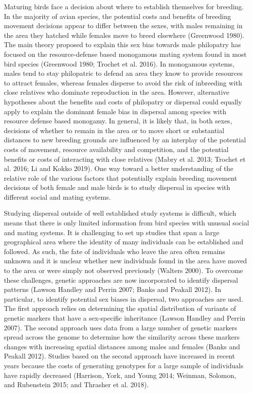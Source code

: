 \documentclass[
]{article}
\begin{document}
Maturing birds face a decision about where to establish themselves for
breeding. In the majority of avian species, the potential costs and
benefits of breeding movement decisions appear to differ between the
sexes, with males remaining in the area they hatched while females move
to breed elsewhere (Greenwood 1980). The main theory proposed to explain
this sex bias towards male philopatry has focused on the
resource-defense based monogamous mating system found in most bird
species (Greenwood 1980; Trochet et al. 2016). In monogamous systems,
males tend to stay philopatric to defend an area they know to provide
resources to attract females, whereas females disperse to avoid the risk
of inbreeding with close relatives who dominate reproduction in the
area. However, alternative hypotheses about the benefits and costs of
philopatry or dispersal could equally apply to explain the dominant
female bias in dispersal among species with resource defense based
monogamy. In general, it is likely that, in both sexes, decisions of
whether to remain in the area or to move short or substantial distances
to new breeding grounds are influenced by an interplay of the potential
costs of movement, resource availability and competition, and the
potential benefits or costs of interacting with close relatives (Mabry
et al. 2013; Trochet et al. 2016; Li and Kokko 2019). One way toward a
better understanding of the relative role of the various factors that
potentially explain breeding movement decisions of both female and male
birds is to study dispersal in species with different social and mating
systems.

Studying dispersal outside of well established study systems is
difficult, which means that there is only limited information from bird
species with unusual social and mating systems. It is challenging to set
up studies that span a large geographical area where the identity of
many individuals can be established and followed. As such, the fate of
individuals who leave the area often remains unknown and it is unclear
whether new individuals found in the area have moved to the area or were
simply not observed previously (Walters 2000). To overcome these
challenges, genetic approaches are now incorporated to identify
dispersal patterns (Lawson Handley and Perrin 2007; Banks and Peakall
2012). In particular, to identify potential sex biases in dispersal, two
approaches are used. The first approach relies on determining the
spatial distribution of variants of genetic markers that have a
sex-specific inheritance (Lawson Handley and Perrin 2007). The second
approach uses data from a large number of genetic markers spread across
the genome to determine how the similarity across these markers changes
with increasing spatial distances among males and females (Banks and
Peakall 2012). Studies based on the second approach have increased in
recent years because the costs of generating genotypes for a large
sample of individuals have rapidly decreased (Harrison, York, and Young
2014; Weinman, Solomon, and Rubenstein 2015; and Thrasher et al. 2018).
\end{document}
